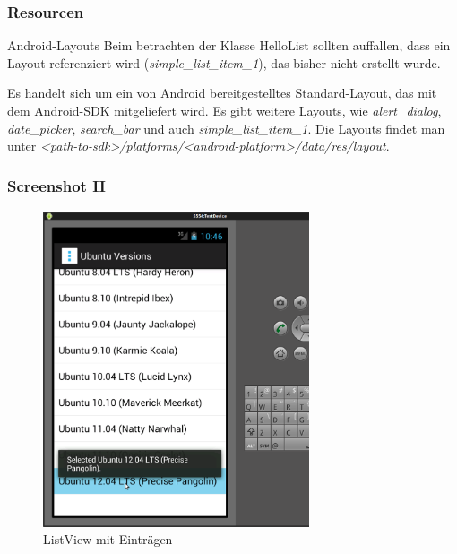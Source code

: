 \begin{frame}
   \frametitle{Resourcen}

   \begin{alertblock}{Android-Layouts}
		Beim betrachten der Klasse HelloList sollten auffallen, dass ein Layout 
		referenziert wird (\emph{simple\_list\_item\_1}), das bisher nicht erstellt wurde.

		\vspace{5mm}

		Es handelt sich um ein von Android bereitgestelltes Standard-Layout, 
		das mit dem Android-SDK mitgeliefert wird. Es gibt weitere Layouts, wie \emph{alert\_dialog}, 
		\emph{date\_picker}, \emph{search\_bar} und auch \emph{simple\_list\_item\_1}. 
		Die Layouts findet man unter \emph{\textless{}path-to-sdk\textgreater{}/platforms/\textless{}android-platform\textgreater{}/data/res/layout}.
   \end{alertblock}
\end{frame}

\begin{frame}
   \frametitle{Screenshot II}
   \begin{figure}[h!]
     \centering
     \includegraphics[width=0.7\textwidth]{pictures/hello_list.ps}
     \caption{
        ListView mit Einträgen
     }
     \label{fig:hello_list}
   \end{figure}
\end{frame}

